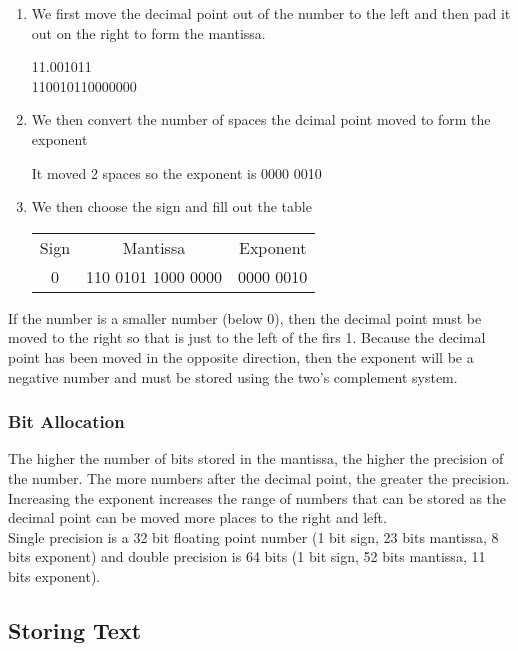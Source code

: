 \documentclass[a4paper, 12pt]{report}
\begin{document}
\begin{enumerate}
\item We first move the decimal point out of the number to the left and then pad it out on the right to form the mantissa.

11.001011 \\
110010110000000

\item We then convert the number of spaces the dcimal point moved to form the exponent

It moved 2 spaces so the exponent is 0000 0010

\item We then choose the sign and fill out the table

\begin{tabular}{ccc}
Sign & Mantissa & Exponent \\
0 & 110 0101 1000 0000 & 0000 0010 \\
\end{tabular}
\end{enumerate}

If the number is a smaller number (below 0), then the decimal point must be moved to the right so that is just to the left of the firs 1.  Because the decimal point has been moved in the opposite direction, then the exponent will be a negative number and must be stored using the two's complement system.

\subsubsection{Bit Allocation}

The higher the number of bits stored in the mantissa, the higher the precision of the number.  The more numbers after the decimal point, the greater the precision. \\

Increasing the exponent increases the range of numbers that can be stored as the decimal point can be moved more places to the right and left. \\

Single precision is a 32 bit floating point number (1 bit sign, 23 bits mantissa, 8 bits exponent) and double precision is  64 bits (1 bit sign, 52 bits mantissa, 11 bits exponent).

\subsection{Storing Text}
\end{document}
